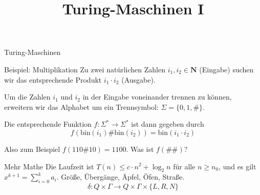 \documentclass{beamer}
\title{Turing-Maschinen I}
\begin{document}
\begin{frame}{Turing-Maschinen}
\begin{block}{Beispiel: Multiplikation}
Zu zwei natürlichen Zahlen $i_1, i_2 \in \mathbf{N}$ (Eingabe) suchen wir das entsprechende Produkt $i_1 \cdot i_2$ (Ausgabe).

Um die Zahlen $i_1$ und $i_2$ in der Eingabe voneinander trennen zu können, erweitern wir das Alphabet um ein Trennsymbol: $\Sigma = \{0, 1, \#\}$.

Die entsprechende Funktion $f : \Sigma^* \to \Sigma^*$ ist dann gegeben durch
\[ f(\mathrm{bin}(i_1)\#\mathrm{bin}(i_2)) = \mathrm{bin}(i_1 \cdot i_2) \]
\end{block}
Also zum Beispiel $f(110\#10) = 1100$. Was ist $f(\#\#)$?
\end{frame}
\begin{frame}{Mehr Mathe}
Die Laufzeit ist $T(n) \le c \cdot n^2 + \log_2 n$ für alle $n \ge n_0$, und es gilt $x^{k+1} = \sum_{i=0}^{k} a_i$.
Größe, Übergänge, Äpfel, Öfen, Straße.
\[ \delta : Q \times \Gamma \to Q \times \Gamma \times \{L, R, N\} \]
\end{frame}
\end{document}
